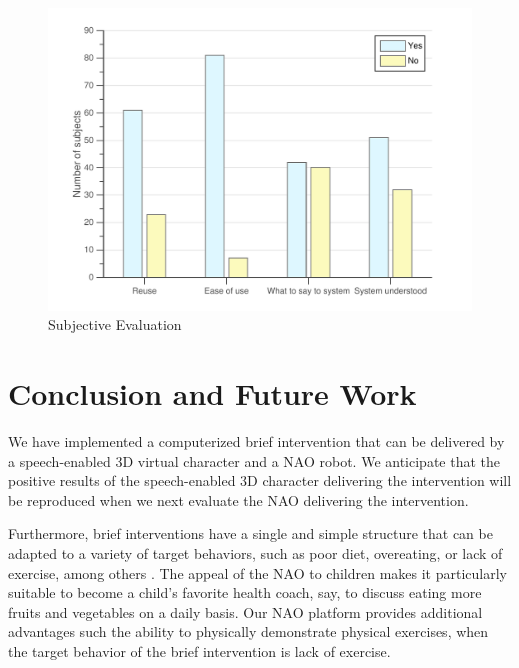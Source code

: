 \documentclass[letterpaper]{article}
\begin{document}
\begin{figure}
 \centering
 \includegraphics[width=\columnwidth]{figures/subjective.pdf}
 \caption{Subjective Evaluation}
 \label{yesNoEva}
 \end{figure}
 

\section*{Conclusion and Future Work} 

We have implemented a computerized brief intervention that can be delivered by a speech-enabled 3D virtual character and a NAO robot.  We anticipate that the positive results of the speech-enabled 3D character delivering the intervention will be reproduced when we next evaluate the NAO delivering the intervention.

Furthermore, brief interventions have a single and simple structure that can be adapted to a variety of target behaviors, such as poor diet, overeating, or lack of exercise, among others \cite{Moyer2002}.
The appeal of the NAO to children 
\cite{belpaeme2012multimodal} makes it particularly suitable to become a child's favorite health 
coach, say, to discuss eating more fruits and vegetables on a daily basis. Our NAO platform 
provides additional advantages such the ability to physically demonstrate physical exercises, when the target behavior of the brief intervention is lack of exercise.

       
   
\end{document}
